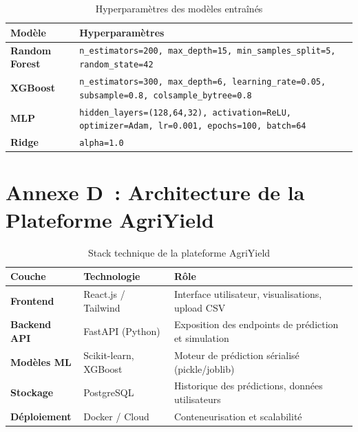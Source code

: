 \begin{table}[H]
\centering
\caption{Hyperparamètres des modèles entraînés}
\label{tab:hyperparams}
\renewcommand{\arraystretch}{1.4}
\begin{tabularx}{\textwidth}{|>{\bfseries}p{3cm}|X|}
\hline
\rowcolor{maingreen!15}\textbf{Modèle} & \textbf{Hyperparamètres} \\
\hline
Random Forest & \texttt{n\_estimators=200, max\_depth=15, min\_samples\_split=5, random\_state=42} \\
\hline
XGBoost & \texttt{n\_estimators=300, max\_depth=6, learning\_rate=0.05, subsample=0.8, colsample\_bytree=0.8} \\
\hline
MLP & \texttt{hidden\_layers=(128,64,32), activation=ReLU, optimizer=Adam, lr=0.001, epochs=100, batch=64} \\
\hline
Ridge & \texttt{alpha=1.0} \\
\hline
\end{tabularx}
\end{table}

\section*{Annexe D~: Architecture de la Plateforme AgriYield}

\begin{table}[H]
\centering
\caption{Stack technique de la plateforme AgriYield}
\label{tab:stack-tech}
\renewcommand{\arraystretch}{1.4}
\begin{tabularx}{\textwidth}{|>{\bfseries}p{3cm}|p{3cm}|X|}
\hline
\rowcolor{maingreen!15}\textbf{Couche} & \textbf{Technologie} & \textbf{Rôle} \\
\hline
Frontend & React.js / Tailwind & Interface utilisateur, visualisations, upload CSV \\
\hline
Backend API & FastAPI (Python) & Exposition des endpoints de prédiction et simulation \\
\hline
Modèles ML & Scikit-learn, XGBoost & Moteur de prédiction sérialisé (pickle/joblib) \\
\hline
Stockage & PostgreSQL & Historique des prédictions, données utilisateurs \\
\hline
Déploiement & Docker / Cloud & Conteneurisation et scalabilité \\
\hline
\end{tabularx}
\end{table}
